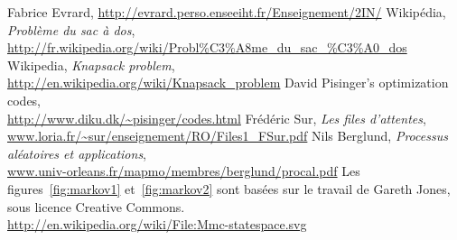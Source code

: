   Fabrice Evrard, \url{http://evrard.perso.enseeiht.fr/Enseignement/2IN/}
  Wikipédia, \emph{Problème du sac à dos},\\
  \url{http://fr.wikipedia.org/wiki/Probl\%C3\%A8me_du_sac_\%C3\%A0_dos}
  Wikipedia, \emph{Knapsack problem},\\
  \url{http://en.wikipedia.org/wiki/Knapsack_problem}
  David Pisinger's optimization codes,\\
  \url{http://www.diku.dk/~pisinger/codes.html}
  Frédéric Sur, \emph{Les files d'attentes}, \\
  \url{www.loria.fr/~sur/enseignement/RO/Files1_FSur.pdf}
  Nils Berglund, \emph{Processus aléatoires et applications}, \\
  \url{www.univ-orleans.fr/mapmo/membres/berglund/procal.pdf}
  Les figures~\ref{fig:markov1} et~\ref{fig:markov2} sont basées sur le travail
  de Gareth Jones, sous licence Creative Commons.\\
  \url{http://en.wikipedia.org/wiki/File:Mmc-statespace.svg}
